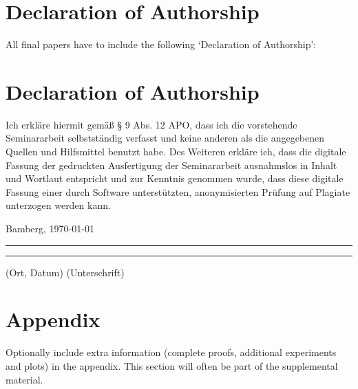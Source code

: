 \documentclass[a4paper]{article}
\begin{document}
\section*{Declaration of Authorship}
All final papers have to include the following ‘Declaration of Authorship’:

{\parindent 0cm
\section*{Declaration of Authorship}
Ich erkläre hiermit gemäß § 9 Abs. 12 APO, dass ich die vorstehende Seminararbeit selbstständig verfasst und keine anderen als die angegebenen Quellen und Hilfsmittel benutzt habe. Des Weiteren erkläre ich, dass die digitale Fassung der gedruckten Ausfertigung der Seminararbeit ausnahmslos in Inhalt und Wortlaut entspricht und zur Kenntnis genommen wurde, dass diese digitale Fassung einer durch Software unterstützten, anonymisierten Prüfung auf Plagiate unterzogen werden kann.\\
\vspace{2\baselineskip}
  
Bamberg, \today

\rule[0.5em]{14em}{0.5pt} \hspace{0.25\linewidth}\rule[0.5em]{14em}{0.5pt}
\vspace{1em}
\hspace{4em} (Ort, Datum) \hspace{0.51\linewidth} (Unterschrift)
}







\appendix


\section{Appendix}


Optionally include extra information (complete proofs, additional experiments and plots) in the appendix.
This section will often be part of the supplemental material.
\end{document}
